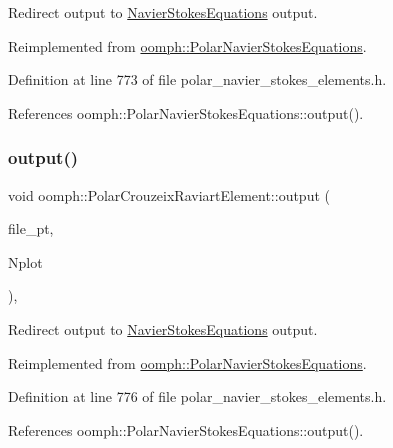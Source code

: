 Redirect output to \hyperlink{classoomph_1_1NavierStokesEquations}{Navier\+Stokes\+Equations} output. 



Reimplemented from \hyperlink{classoomph_1_1PolarNavierStokesEquations_aad582ad191d1dd67ee148495ee46778e}{oomph\+::\+Polar\+Navier\+Stokes\+Equations}.



Definition at line 773 of file polar\+\_\+navier\+\_\+stokes\+\_\+elements.\+h.



References oomph\+::\+Polar\+Navier\+Stokes\+Equations\+::output().

\mbox{\label{classoomph_1_1PolarCrouzeixRaviartElement_a0e5c165c36dacf83709bd8c6fba1be40}} 
\subsubsection{\texorpdfstring{output()}{output()}\hspace{0.1cm}{\footnotesize\ttfamily [4/4]}}
{\footnotesize\ttfamily void oomph\+::\+Polar\+Crouzeix\+Raviart\+Element\+::output (\begin{DoxyParamCaption}\item[{F\+I\+LE $\ast$}]{file\+\_\+pt,  }\item[{const unsigned \&}]{Nplot }\end{DoxyParamCaption})\hspace{0.3cm}{\ttfamily [inline]}, {\ttfamily [virtual]}}



Redirect output to \hyperlink{classoomph_1_1NavierStokesEquations}{Navier\+Stokes\+Equations} output. 



Reimplemented from \hyperlink{classoomph_1_1PolarNavierStokesEquations_a1dd19ac88c126db21ad12bdb06a512f9}{oomph\+::\+Polar\+Navier\+Stokes\+Equations}.



Definition at line 776 of file polar\+\_\+navier\+\_\+stokes\+\_\+elements.\+h.



References oomph\+::\+Polar\+Navier\+Stokes\+Equations\+::output().

